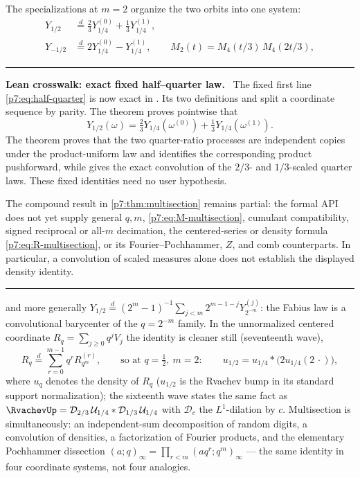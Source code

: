\documentclass[11pt,oneside]{article}
\numberwithin{equation}{section}
\theoremstyle{definition}
\theoremstyle{remark}
\newenvironment{statusbox}[1]{%
  \par\medskip\noindent\begin{center}\begin{minipage}{0.94\textwidth}%
  \color{linkblue}\hrule\vspace{0.65em}%
  \color{black}\textbf{\color{linkblue}#1.}\ }{%
  \par\vspace{0.65em}\color{linkblue}\hrule
  \end{minipage}\end{center}\medskip}
\begin{document}
The specializations at $m=2$ organize the two orbits into one system:
\begin{align}
 Y_{1/2}&\overset d=\tfrac23Y_{1/4}^{(0)}+\tfrac13Y_{1/4}^{(1)},
 \label{p7:eq:half-quarter}\\
 Y_{-1/2}&\overset d=2Y_{1/4}^{(0)}-Y_{1/4}^{(1)},
 \qquad
 M_2(t)=M_4(t/3)\,M_4(2t/3),
 \label{p7:eq:signed-reciprocal-decimation}
\end{align}

\begin{statusbox}{Lean crosswalk: exact fixed half--quarter law}
The fixed first line \cref{p7:eq:half-quarter} is now exact in
.  Its two definitions
 and  split a coordinate sequence by
parity.  The theorem  proves
pointwise that
\[
 Y_{1/2}(\omega)=\tfrac23Y_{1/4}(\omega^{(0)})
                  +\tfrac13Y_{1/4}(\omega^{(1)}).
\]
The theorem  proves that
the two quarter-ratio processes are independent copies under the product-uniform
law and identifies the corresponding product pushforward, while
 gives the exact
convolution of the \(2/3\)- and \(1/3\)-scaled quarter laws.  These fixed
identities need no user hypothesis.

The compound result in \cref{p7:thm:multisection} remains partial: the formal API
does not yet supply general \(q,m\), \cref{p7:eq:M-multisection}, cumulant
compatibility, signed reciprocal or all-\(m\) decimation, the centered-series or
density formula \cref{p7:eq:R-multisection}, or its Fourier--Pochhammer, \(Z\),
and comb counterparts.  In particular, a convolution of scaled measures alone
does not establish the displayed density identity.
\end{statusbox}

and more generally
$Y_{1/2}\overset d=(2^m-1)^{-1}\sum_{j<m}2^{m-1-j}Y_{2^{-m}}^{(j)}$: the
Fabius law is a convolutional barycenter of the $q=2^{-m}$ family.  In the
unnormalized centered coordinate $R_q=\sum_{j\ge0}q^jV_j$ the identity is
cleaner still (seventeenth wave),
\begin{equation}\label{p7:eq:R-multisection}
 R_q\overset d=\sum_{r=0}^{m-1}q^rR_{q^m}^{(r)},
 \qquad\text{so at }q=\tfrac12,\ m=2:\qquad
 u_{1/2}=u_{1/4}*\bigl(2u_{1/4}(2\,\cdot)\bigr),
\end{equation}
where $u_q$ denotes the density of $R_q$ ($u_{1/2}$ is the Rvachev bump in
its standard support normalization); the sixteenth wave states the same fact
as $\RvachevUp=\mathcal D_{2/3}\,\mathcal U_{1/4}*\mathcal D_{1/3}\,\mathcal U_{1/4}$
with $\mathcal D_c$ the $L^1$-dilation by $c$.  Multisection is
simultaneously: an independent-sum decomposition of random digits, a
convolution of densities, a factorization of Fourier products, and the
elementary Pochhammer dissection
$(a;q)_\infty=\prod_{r<m}(aq^r;q^m)_\infty$ --- the same identity in four
coordinate systems, not four analogies.
\end{document}
